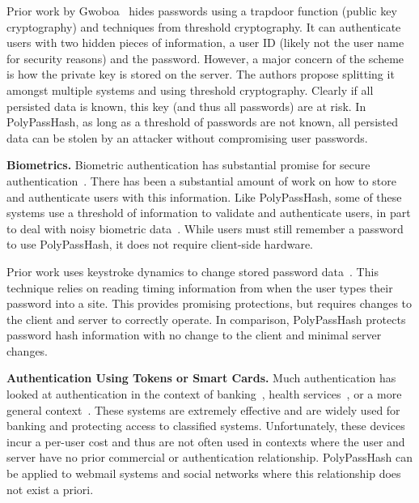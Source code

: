 Prior work by Gwoboa~\cite{gwoboa1995password} hides passwords using
a trapdoor function (public key cryptography) and techniques from threshold
cryptography.   It can authenticate users with two hidden pieces of 
information, a user ID (likely not the user name for security reasons) and 
the password.   However, a major concern of the scheme is how the private
key is stored on the server.   The authors propose splitting it amongst 
multiple systems and using threshold cryptography.   Clearly if all 
persisted data is known, this key (and thus all passwords) are at risk.
In PolyPassHash, as long as a threshold of passwords are not known, all 
persisted data can be stolen by an attacker without compromising user 
passwords.


{\bf Biometrics.}
Biometric authentication has substantial promise for secure
authentication~\cite{atallah2005secure, snelick2005large, tuyls2004capacity, 
boyen2005secure, erkin2009privacy, kerschbaum2004private, osadchy2010scifi,
monrose2001cryptographic, sae2012biometric}.
There has been a substantial amount of work on how to store and authenticate 
users with this information.   Like PolyPassHash, some of these systems 
use a threshold of information to validate and authenticate users, in part
to deal with noisy biometric data~\cite{juels2006fuzzy, ballard2008practical}.  
While users must still remember a password to use PolyPassHash, it does not 
require client-side hardware.

Prior work uses keystroke dynamics to change stored password 
data~\cite{monrose2000keystroke}.  This technique relies on reading timing 
information from when the user types their password into a site.   This 
provides promising protections, but requires changes to the client and server 
to correctly operate.   In comparison, PolyPassHash protects password
hash information with no change to the client and minimal server changes.

{\bf Authentication Using Tokens or Smart Cards.}
Much authentication has looked at authentication in the context of
banking~\cite{deo1998authentication, yeh2010two}, health 
services~\cite{ahn2002towards},
or a more general context~\cite{chien2002efficient, yang1999password}.   These 
systems are
extremely effective and are widely used for banking and protecting access
to classified systems.   Unfortunately, these devices incur a per-user 
cost and thus are not often used in contexts where the user and server have
no prior commercial or authentication relationship.   PolyPassHash can 
be applied to webmail systems and social networks where this relationship
does not exist a priori.

